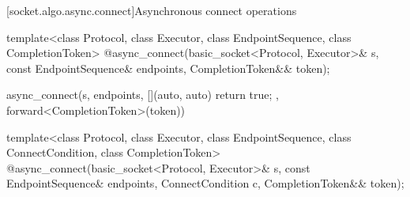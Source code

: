 [socket.algo.async.connect]{Asynchronous connect operations}

\begin{itemdecl}
template<class Protocol, class Executor, class EndpointSequence, class CompletionToken>
  @\DEDUCED@ async_connect(basic_socket<Protocol, Executor>& s,
                        const EndpointSequence& endpoints,
                        CompletionToken&& token);
\end{itemdecl}

\begin{itemdescr}
\pnum
\returns
\begin{codeblock}
async_connect(s, endpoints, [](auto, auto){ return true; }, forward<CompletionToken>(token))
\end{codeblock}
\end{itemdescr}

\begin{itemdecl}
template<class Protocol, class Executor, class EndpointSequence,
  class ConnectCondition, class CompletionToken>
    @\DEDUCED@ async_connect(basic_socket<Protocol, Executor>& s,
                          const EndpointSequence& endpoints,
                          ConnectCondition c,
                          CompletionToken&& token);
\end{itemdecl}

